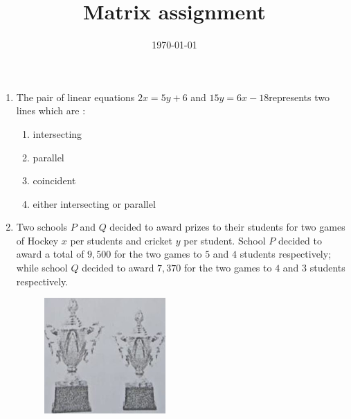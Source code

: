 \documentclass[12pt,-letter paper]{article}\usepackage{siunitx}
\title{Matrix assignment}
\date{\today}
\begin{document}
\begin{enumerate}
	\item The pair of linear equations $ 2x=5y+6 $ and $ 15y=6x-18 $represents two lines which are : 
\begin{enumerate}
    \item intersecting
    \item parallel
    \item coincident
    \item either intersecting or parallel
\end{enumerate}
\item Two schools $P$ and $Q$ decided to award prizes to their students for two games of Hockey \rupee $x$ per students and cricket \rupee $y$ per student. School $P$
decided to award a total of \rupee $9,500$ for the two games to $5$ and $4$ students respectively; while school $Q$ decided to award \rupee $7,370$ for the two games to $4$ and $3$ students respectively.
\begin{figure}[H]
    \centering
    \includegraphics[width=\columnwidth]{math.png}
    \label{prizes}
\end{figure}



\end{enumerate}
\end{document}
